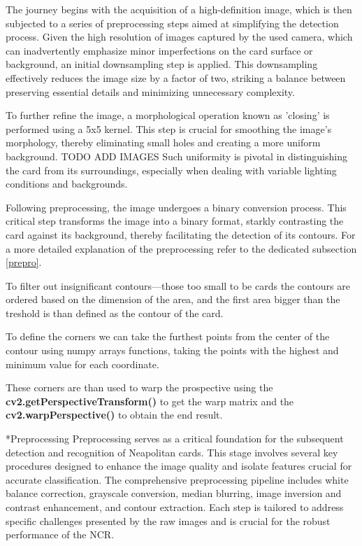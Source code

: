 \documentclass[twocolumn, a4paper,10pt]{article}
\makeatletter
\renewcommand\subsection{\@startsection{subsection}{1}{\z@}{\z@}{\z@}{\normalfont\normalsize\bfseries}}
\renewcommand\subsection{\@startsection{subsection}{1}{\z@}{\z@}{0.1pt}{\normalfont\normalsize\bfseries}}
\makeatother
\begin{document}
The journey begins with the acquisition of a high-definition image, which is then subjected to a series of preprocessing steps aimed at simplifying the detection process. Given the high resolution of images captured by the used camera, which can inadvertently emphasize minor imperfections on the card surface or background, an initial downsampling step is applied. This downsampling effectively reduces the image size by a factor of two, striking a balance between preserving essential details and minimizing unnecessary complexity.

To further refine the image, a morphological operation known as 'closing' is performed using a 5x5 kernel. This step is crucial for smoothing the image's morphology, thereby eliminating small holes and creating a more uniform background. TODO ADD IMAGES Such uniformity is pivotal in distinguishing the card from its surroundings, especially when dealing with variable lighting conditions and backgrounds.

Following preprocessing, the image undergoes a binary conversion process. This critical step transforms the image into a binary format, starkly contrasting the card against its background, thereby facilitating the detection of its contours. For a more detailed explanation of the preprocessing refer to the dedicated subsection \ref*{prepro}.

To filter out insignificant contours—those too small to be cards the contours are ordered based on the dimension of the area, and the first area bigger than the treshold is than defined as the contour of the card.

To define the corners we can take the furthest points from the center of the contour using numpy arrays functions, taking the points with the highest and minimum value for each coordinate.

These corners are than used to warp the prospective using the \textbf{cv2.getPerspectiveTransform()} to get the warp matrix and the \textbf{cv2.warpPerspective()} to obtain the end result.


\subsection*{Preprocessing} \label{prepro}
Preprocessing serves as a critical foundation for the subsequent detection and recognition of Neapolitan cards. This stage involves several key procedures designed to enhance the image quality and isolate features crucial for accurate classification. The comprehensive preprocessing pipeline includes  white balance correction, grayscale conversion, median blurring, image inversion and contrast enhancement, and contour extraction. Each step is tailored to address specific challenges presented by the raw images and is crucial for the robust performance of the NCR.
 
\end{document}
